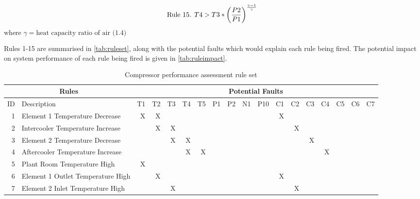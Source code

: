 \begin{equation}
\text{Rule 15. } T4 > T3 * \left(\frac{P2}{P1}\right)^\frac{\gamma-1}{\gamma} \\
\label{eq:rule15}
\end{equation}
$\text{where } \gamma = \text{heat capacity ratio of air (1.4)}$

Rules 1-15 are summarised in \autoref{tab:ruleset}, along with the potential faults which would explain each rule being fired. The potential impact on system performance of each rule being fired is given in \autoref{tab:ruleimpact}.

  
\begin{table}[htbp]
  \centering
  \scriptsize
  \caption{Compressor performance assessment rule set}
    \begin{tabular}{r|l|r|r|r|r|r|r|r|r|r|r|r|r|r|r|r|r}
    \toprule
    \multicolumn{2}{c}{Rules} & \multicolumn{16}{c}{Potential Faults} \\
    \midrule
    ID    & Description & T1    & T2    & T3    & T4    & T5    & P1    & P2    & N1    & P10   & C1    & C2    & C3    & C4    & C5    & C6    & C7 \\
    \midrule
    1     & Element 1 Temperature Decrease & X     & X     &       &       &       &       &       &       &       & X     &       &       &       &       &       &  \\
    2     & Intercooler Temperature Increase &       & X     & X     &       &       &       &       &       &       &       & X     &       &       &       &       &  \\
    3     & Element 2 Temperature Decrease &       &       & X     & X     &       &       &       &       &       &       &       & X     &       &       &       &  \\
    4     & Aftercooler Temperature Increase &       &       &       & X     & X     &       &       &       &       &       &       &       & X     &       &       &  \\
    5     & Plant Room Temperature High & X     &       &       &       &       &       &       &       &       &       &       &       &       &       &       &  \\
    6     & Element 1 Outlet Temperature High &       & X     &       &       &       &       &       &       &       & X     &       &       &       &       &       &  \\
    7     & Element 2 Inlet Temperature High &       &       & X     &       &       &       &       &       &       &       & X     &       &       &       &       &  \\

\end{tabular}
\end{table}
